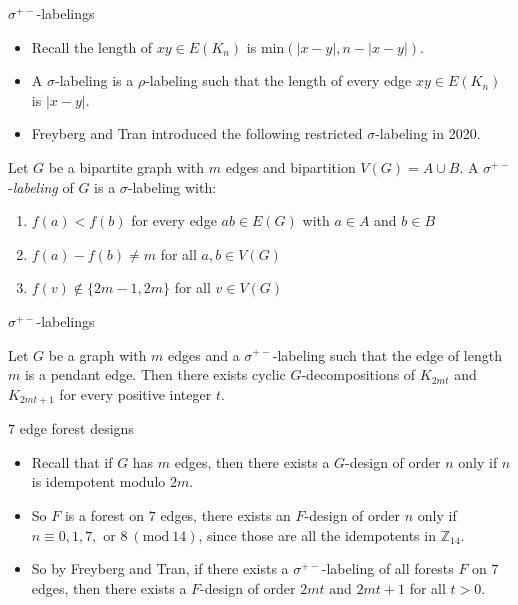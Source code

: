 \documentclass{beamer}
\theoremstyle{plain}
\newcommand{\ZZ}{\ensuremath{\mathbb{Z}}}
\newcommand{\Mod}[1]{\ (\mathrm{mod}\ #1)}
\begin{document}
    \begin{frame}{$\sigma^{+-}$-labelings}
        \begin{itemize}
            \item Recall the length of  $xy \in E(K_n)$ is min$(|x-y|,n-|x-y|).$
            \pause
            \item A $\sigma$-labeling is a $\rho$-labeling such that the length of every edge $xy \in E(K_n)$ is $|x-y|.$
            \pause
            \item Freyberg and Tran introduced the following restricted $\sigma$-labeling in 2020.
        \end{itemize}
        \begin{definition}
         Let $G$ be a bipartite graph with $m$ edges and bipartition $V(G)=A\cup B$. A $\sigma^{+-}$-\emph{labeling} of $G$ is a $\sigma$-labeling with:
        \begin{enumerate}
            \item $f(a)<f(b)$ for every edge $ab\in E(G)$ with $a\in A$ and $b \in B$
            \item $f(a)-f(b) \neq m$ for all $a,b \in V(G)$
            \item $f(v) \not \in \{2m-1,2m\}$ for all $v \in V(G)$
        \end{enumerate}   
        \end{definition}    
        
        \end{frame}
        \begin{frame}{$\sigma^{+-}$-labelings}
            \begin{theorem}  
        Let $G$ be a graph with $m$ edges and a $\sigma^{+-}$-labeling such that the edge of length $m$ is a pendant edge. Then there exists cyclic $G$-decompositions of $K_{2mt}$ and $K_{2mt+1}$ for every positive integer $t.$
        \end{theorem}
        
        \end{frame}

    \begin{frame}{$7$ edge forest designs}
        \begin{itemize}
            \item Recall that if $G$ has $m$ edges, then there exists a $G$-design of order $n$ only if $n$ is idempotent modulo $2m$.
            \item So $F$ is a forest on $7$ edges, there exists an $F$-design of order $n$ only if $n\equiv 0,1,7,\text{ or }8\Mod{14}$, since those are all the idempotents in $\ZZ_{14}$.
            \item So by Freyberg and Tran, if there exists a $\sigma^{+-}$-labeling of all forests $F$ on $7$ edges, then there exists a $F$-design of order $2mt$ and $2mt+1$ for all $t>0$.
        \end{itemize}
    \end{frame}
\end{document}
